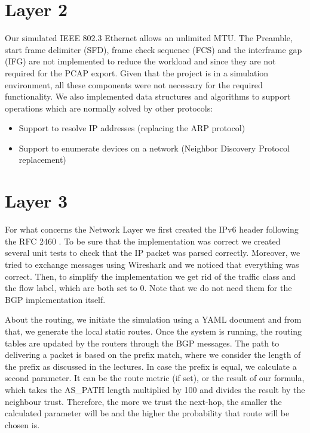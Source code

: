 \section{Layer 2}\label{layer2}
Our simulated IEEE 802.3 Ethernet allows an unlimited MTU.
The Preamble, start frame delimiter (SFD), frame check sequence (FCS) and the interframe gap (IFG) are not implemented to reduce the workload and since they are not required for the PCAP export.
Given that the project is in a simulation environment, all these components were not necessary for the required functionality.\newline
We also implemented data structures and algorithms to support operations which are normally solved by other protocols:
\begin{itemize}
    \item Support to resolve IP addresses (replacing the ARP protocol)
    \item Support to enumerate devices on a network (Neighbor Discovery Protocol replacement)
\end{itemize}


\section{Layer 3}\label{layer3}
For what concerns the Network Layer we first created the IPv6 header following the RFC 2460 \cite{rfc2460}.\newline
To be sure that the implementation was correct we created several unit tests to check that the IP packet was parsed correctly.
Moreover, we tried to exchange messages using Wireshark and we noticed that everything was correct.\newline
Then, to simplify the implementation we get rid of the traffic class and the flow label, which are both set to 0.
Note that we do not need them for the BGP implementation itself.
\par About the routing, we initiate the simulation using a YAML document and from that, we generate the local static routes.\newline
Once the system is running, the routing tables are updated by the routers through the BGP messages.
The path to delivering a packet is based on the prefix match, where we consider the length of the prefix as discussed in the lectures.\newline
In case the prefix is equal, we calculate a second parameter.
It can be the route metric (if set), or the result of our formula, which takes the AS\_PATH length multiplied by 100 and divides the result by the neighbour trust.
Therefore, the more we trust the next-hop, the smaller the calculated parameter will be and the higher the probability that route will be chosen is.

